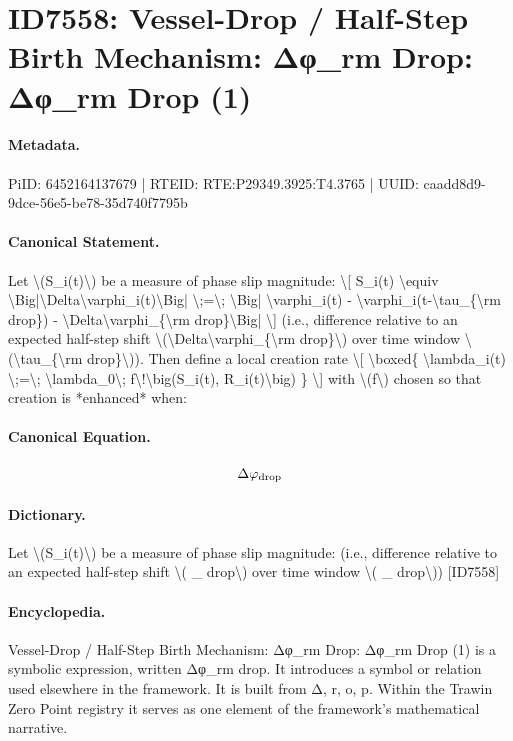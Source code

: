 \section*{ID7558: Vessel-Drop / Half-Step Birth Mechanism: Δφ\_rm Drop: Δφ\_rm Drop (1)}
\paragraph{Metadata.}
PiID: 6452164137679 | RTEID: RTE:P29349.3925:T4.3765 | UUID: caadd8d9-9dce-56e5-be78-35d740f7795b

\paragraph{Canonical Statement.}
Let \textbackslash{}(S\_i(t)\textbackslash{}) be a measure of phase slip magnitude: \textbackslash{}[ S\_i(t) \textbackslash{}equiv \textbackslash{}Big|\textbackslash{}Delta\textbackslash{}varphi\_i(t)\textbackslash{}Big| \textbackslash{};=\textbackslash{}; \textbackslash{}Big| \textbackslash{}varphi\_i(t) - \textbackslash{}varphi\_i(t-\textbackslash{}tau\_\{\textbackslash{}rm drop\}) - \textbackslash{}Delta\textbackslash{}varphi\_\{\textbackslash{}rm drop\}\textbackslash{}Big| \textbackslash{}] (i.e., difference relative to an expected half-step shift \textbackslash{}(\textbackslash{}Delta\textbackslash{}varphi\_\{\textbackslash{}rm drop\}\textbackslash{}) over time window \textbackslash{}(\textbackslash{}tau\_\{\textbackslash{}rm drop\}\textbackslash{})). Then define a local creation rate \textbackslash{}[ \textbackslash{}boxed\{ \textbackslash{}lambda\_i(t) \textbackslash{};=\textbackslash{}; \textbackslash{}lambda\_0\textbackslash{}; f\textbackslash{}!\textbackslash{}big(S\_i(t), R\_i(t)\textbackslash{}big) \} \textbackslash{}] with \textbackslash{}(f\textbackslash{}) chosen so that creation is *enhanced* when:

\paragraph{Canonical Equation.}
\[
\Delta\varphi_{\rm drop}
\]

\paragraph{Dictionary.}
Let \textbackslash{}(S\_i(t)\textbackslash{}) be a measure of phase slip magnitude: (i.e., difference relative to an expected half-step shift \textbackslash{}( \_ drop\textbackslash{}) over time window \textbackslash{}( \_ drop\textbackslash{})) [ID7558]

\paragraph{Encyclopedia.}
Vessel-Drop / Half-Step Birth Mechanism: Δφ\_rm Drop: Δφ\_rm Drop (1) is a symbolic expression, written Δφ\_rm drop. It introduces a symbol or relation used elsewhere in the framework. It is built from Δ, r, o, p. Within the Trawin Zero Point registry it serves as one element of the framework's mathematical narrative.
